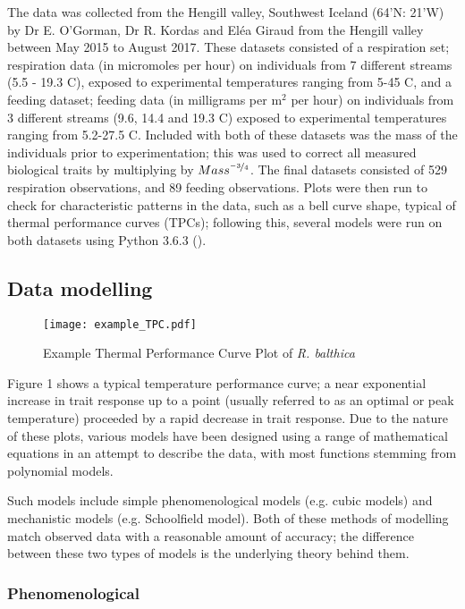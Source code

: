 \documentclass[../../Paper.tex]{subfiles}
\begin{document}
The data was collected from the Hengill valley, Southwest Iceland (64'N: 21'W) by Dr E. 
O'Gorman, Dr R. Kordas and El\'{e}a Giraud from the Hengill valley between May 2015 to August 2017.
These datasets consisted of a respiration set; respiration data (in micromoles per hour) on
individuals from 7 different streams (5.5 - 19.3 \degree C), exposed to experimental
temperatures ranging from 5-45 \degree C, and a feeding dataset; feeding data (in milligrams per m$^{2}$
per hour) on individuals from 3 different streams (9.6, 14.4 and 19.3 \degree C) exposed to experimental
temperatures ranging from 5.2-27.5 \degree C. Included with both of these datasets was the mass of 
the individuals prior to experimentation; this was used to correct all measured biological traits
by multiplying by $Mass^{\nicefrac{-3}{4}}$. The final datasets consisted of 529 respiration observations, 
and 89 feeding observations. Plots were then run to check for characteristic patterns
in the data, such as a bell curve shape, typical of thermal performance curves (TPCs); following this, several models were run on both datasets using Python 3.6.3 (\cite{van_rossum_python_2001}).

\subsection*{Data modelling}

\begin{figure}[H]
\texttt{[image: example\_TPC.pdf]}
\caption{Example Thermal Performance Curve Plot of \textit{R. balthica}}

\end{figure}

Figure 1 shows a typical temperature performance curve; a near exponential
increase in trait response up to a point (usually referred to as an optimal or peak temperature)
proceeded by a rapid decrease in trait response. Due to the nature of these plots, various models 
have been designed using a range of mathematical equations in an attempt to describe the data, 
with most functions stemming from polynomial models.

Such models include simple phenomenological models (e.g. cubic models) and 
mechanistic models (e.g. Schoolfield model). Both of these methods of modelling 
match observed data with a reasonable amount of accuracy; the difference between 
these two types of models is the underlying theory behind them. 

\subsubsection*{Phenomenological}
\end{document}
